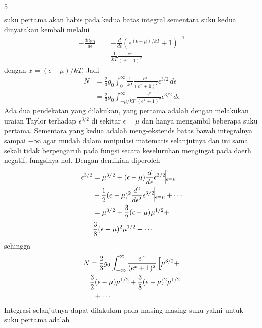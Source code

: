 \documentclass[a4paper  , 6 pt]{article}
\begin{document}
\begin{tiny}
\begin{multicols} {5}
\begin{align}
\end{align}  
suku pertama akan habis pada kedua batas integral sementara suku kedua dinyatakan kembali melalui 
\begin{align}
- \frac{d \overline{n}_\mathrm{FD}}{d \epsilon } & = - \frac{d}{d \epsilon } (e^{(\epsilon - \mu )/kT }+ 1)^{-1} \nonumber \\
& = \frac{1}{kT} \frac{e^x}{(e^x + 1) ^2} 
\end{align}
dengan $x = (\epsilon - \mu )/ kT$. \newline Jadi 
\begin{align}
N& = \frac{2}{3} g_0 \int_{0}^{\infty} \frac{1}{kT} \frac{e^x}{(e^x +1)^2} \epsilon^{3/2} \, d \epsilon  \nonumber \\
& = \frac{2}{3} g_0 \int_{-\mu/kT}^{\infty} \frac{e^x}{(e^x + 1)^2} \epsilon^{3/2}  \, d \epsilon
\end{align}
Ada dua pendekatan yang dilakukan, yang pertama adalah
dengan melakukan uraian Taylor terhadap $\epsilon^{3/2} $ di sekitar $\epsilon = \mu $  dan hanya mengambil beberapa suku pertama. Sementara yang kedua adalah meng-ekstends batas bawah integralnya sampai $- \infty$ agar mudah dalam mnipulasi matematis selanjutnya dan ini sama sekali tidak berpengaruh pada fungsi secara keseluruhan mengingat pada daerh negatif, fungsinya nol.
\newline Dengan demikian diperoleh
\begin{align}
\epsilon^{3/2}& = \mu^{3/2} + (\epsilon - \mu  ) \frac{d}{d \epsilon} \epsilon^{3/2} \vline_{\epsilon = \mu } \nonumber \\
&+ \frac{1}{2} (\epsilon - \mu )^2  \frac{d^2}{d \epsilon^2} \epsilon^{3/2} \vline_{\epsilon = \mu } + \cdots \nonumber \\ 
& = \mu^{3/2} + \frac{3}{2} (\epsilon -\mu )\mu^{1/2} + \nonumber \\
& \frac{3}{8} (\epsilon - \mu )^2 \mu^{1/2} + \cdots  
 \end{align}
sehingga 
\begin{align}
N & = \frac{2}{3} g_0 \int_{-\infty}^{\infty} \frac{e^x}{(e^x + 1)^2} \left [ \mu^{ 3/2} + \right. \nonumber \\
 & \frac{3}{2} (\epsilon - \mu )\mu^{1/2}  + \frac{3}{8} (\epsilon - \mu)^2 \mu^{1/2}\nonumber \\
 & \hspace{0.2 cm } + \cdots 
\end{align}
Integrasi selanjutnya dapat dilakukan pada masing-masing suku yakni untuk suku pertama adalah

\end{multicols}
\end{tiny}
\end{document}
